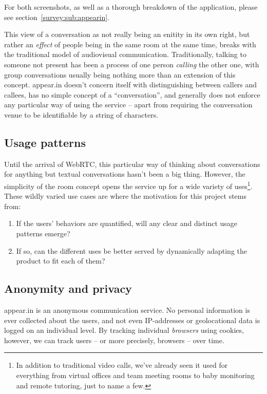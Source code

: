 For both screenshots, as well as a thorough breakdown of the application, please see section~\ref{survey:sub:appearin}.

This view of a conversation as not really being an enitity in its own right, but rather an \emph{effect} of people being in the same room at the same time, breaks with the traditional model of audiovisual communication. Traditionally, talking to someone not present has been a process of one person \emph{calling} the other one, with group conversations usually being nothing more than an extension of this concept. appear.in doesn't concern itself with distinguishing between callers and callees, has no simple concept of a ``conversation'', and generally does not enforce any particular way of using the service -- apart from requiring the conversation venue to be identifiable by a string of characters.

\subsection{Usage patterns}

Until the arrival of WebRTC, this particular way of thinking about conversations for anything but textual conversations hasn't been a big thing. However, the simplicity of the room concept opens the service up for a wide variety of uses\footnote{In addition to traditional video calls, we've already seen it used for everything from virtual offices and team meeting rooms to baby monitoring and remote tutoring, just to name a few.}. These wildly varied use cases are where the motivation for this project stems from:

\begin{enumerate}
  \item If the users' behaviors are quantified, will any clear and distinct usage patterns emerge?
  \item If so, can the different uses be better served by dynamically adapting the product to fit each of them?
\end{enumerate}

\subsection{Anonymity and privacy}
\label{intro:sub:anonymity_privacy}

appear.in is an anonymous communication service. No personal information is ever collected about the users, and not even IP-addresses or geolocational data is logged on an individual level. By tracking individual \emph{browsers} using cookies, however, we can track users -- or more precisely, browsers -- over time.

